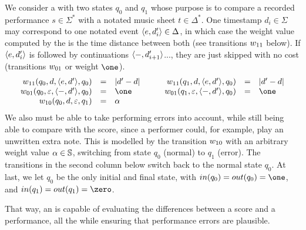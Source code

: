 \begin{example}
We consider a \SWT with two states $q_0$ and $q_1$ whose purpose 
is to compare a recorded performance $s \in \Sigma^*$
with a notated music sheet $t \in \Delta^*$.
One timestamp $d_i \in \Sigma$ may correspond 
to one notated event $\<\mathsf{e}, d'_i> \in \Delta$, in which case 
the weight value computed by the \SWT is the time distance between both
(see transitions $\wei_{11}$ below).
%
If $\<\mathsf{e}, d'_i>$ is followed by continuations 
$\<\mathsf{-}, d'_{i+1}>$..., they are just skipped with no cost (transitions $\wei_{01}$ or weight $\one$).
\[
\begin{array}{rclcrcl}
\wei_{11}(q_0, d, \< \mathsf{e}, d'>, q_0) & = & |d' - d| & \quad &
\wei_{11}(q_1, d, \< \mathsf{e}, d'>, q_0) & = & |d' - d|\\
\wei_{01}(q_0, \varepsilon, \< \mathsf{-}, d'>, q_0) & = & \one & &
\wei_{01}(q_1, \varepsilon, \< \mathsf{-}, d'>, q_0) & = & \one\\
\wei_{10}(q_0, d, \varepsilon, q_1) & = & \alpha & & %
\end{array}
\]
%
We also must be able to take performing errors into account, while still being able to compare with the score, 
since a performer could, for example, play an unwritten extra note. 
%
This is modelled by the transition $\wei_{10}$ with an arbitrary weight value $\alpha \in \mathbb{S}$, 
switching from state $q_0$ (normal) to $q_1$ (error).
The transitions in the second column below switch back to the normal state $q_0$.
At last, we let $q_0$ be the only initial and final state, with
$\init(q_0) = \final(q_0) = \one$, and 
$\init(q_1) = \final(q_1) = \zero$. 

That way, an \SWT is capable of evaluating the differences between a score and a performance, 
all the while ensuring that performance errors are plausible.

\endex
\end{example}

